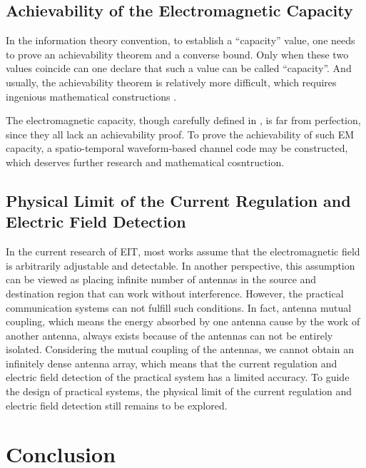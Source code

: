 \documentclass[journal,twocolumn]{IEEEtran}
\begin{document}
\subsection{Achievability of the Electromagnetic Capacity}
In the information theory convention, to establish a ``capacity'' value, one needs to prove an achievability theorem and a converse bound. Only when these two values coincide can one declare that such a value can be called ``capacity''. And usually, the achievability theorem is relatively more difficult, which requires ingenious mathematical constructions \cite{shannon1948mathematical}. 

The electromagnetic capacity, though carefully defined in \cite{wan2022mutual,zhangzijian}, is far from perfection, since they all lack an achievability proof. 
To prove the achievability of such EM capacity, a spatio-temporal waveform-based channel code may be constructed, which deserves further research and mathematical cosntruction.  

\subsection{Physical Limit of the Current Regulation and Electric Field Detection}
In the current research of EIT, most works assume that the electromagnetic field is arbitrarily adjustable and detectable. In another perspective, this assumption can be viewed as placing infinite number of antennas in the source and destination region that can work without interference. However, the practical communication systems can not fulfill such conditions. In fact, antenna mutual coupling, which means the energy absorbed by one antenna cause by the work of another antenna, always exists because of the antennas can not be entirely isolated. Considering the mutual coupling of the antennas, we cannot obtain an infinitely dense antenna array, which means that the current regulation and electric field detection of the practical system has a limited accuracy. To guide the design of practical systems, the physical limit of the current regulation and electric field detection still remains to be explored. 

\section{Conclusion}


\footnotesize



\end{document}
